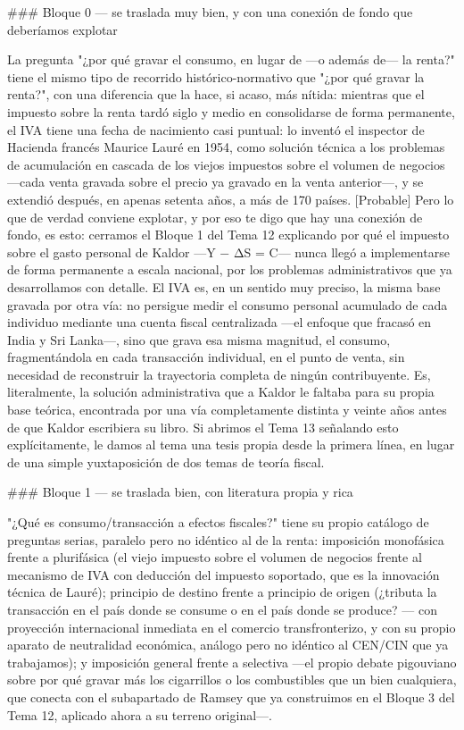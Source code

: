 \documentclass[10pt,a4paper]{article}
\begin{document}
### Bloque 0 — se traslada muy bien, y con una conexión de fondo que deberíamos explotar

La pregunta "¿por qué gravar el consumo, en lugar de —o además de— la renta?" tiene el mismo tipo de recorrido histórico-normativo que "¿por qué gravar la renta?", con una diferencia que la hace, si acaso, más nítida: mientras que el impuesto sobre la renta tardó siglo y medio en consolidarse de forma permanente, el IVA tiene una fecha de nacimiento casi puntual: lo inventó el inspector de Hacienda francés Maurice Lauré en 1954, como solución técnica a los problemas de acumulación en cascada de los viejos impuestos sobre el volumen de negocios —cada venta gravada sobre el precio ya gravado en la venta anterior—, y se extendió después, en apenas setenta años, a más de 170 países. [Probable] Pero lo que de verdad conviene explotar, y por eso te digo que hay una conexión de fondo, es esto: cerramos el Bloque 1 del Tema 12 explicando por qué el impuesto sobre el gasto personal de Kaldor —Y − ΔS = C— nunca llegó a implementarse de forma permanente a escala nacional, por los problemas administrativos que ya desarrollamos con detalle. El IVA es, en un sentido muy preciso, la misma base gravada por otra vía: no persigue medir el consumo personal acumulado de cada individuo mediante una cuenta fiscal centralizada —el enfoque que fracasó en India y Sri Lanka—, sino que grava esa misma magnitud, el consumo, fragmentándola en cada transacción individual, en el punto de venta, sin necesidad de reconstruir la trayectoria completa de ningún contribuyente. Es, literalmente, la solución administrativa que a Kaldor le faltaba para su propia base teórica, encontrada por una vía completamente distinta y veinte años antes de que Kaldor escribiera su libro. Si abrimos el Tema 13 señalando esto explícitamente, le damos al tema una tesis propia desde la primera línea, en lugar de una simple yuxtaposición de dos temas de teoría fiscal.

### Bloque 1 — se traslada bien, con literatura propia y rica

"¿Qué es consumo/transacción a efectos fiscales?" tiene su propio catálogo de preguntas serias, paralelo pero no idéntico al de la renta: imposición monofásica frente a plurifásica (el viejo impuesto sobre el volumen de negocios frente al mecanismo de IVA con deducción del impuesto soportado, que es la innovación técnica de Lauré); principio de destino frente a principio de origen (¿tributa la transacción en el país donde se consume o en el país donde se produce? — con proyección internacional inmediata en el comercio transfronterizo, y con su propio aparato de neutralidad económica, análogo pero no idéntico al CEN/CIN que ya trabajamos); y imposición general frente a selectiva —el propio debate pigouviano sobre por qué gravar más los cigarrillos o los combustibles que un bien cualquiera, que conecta con el subapartado de Ramsey que ya construimos en el Bloque 3 del Tema 12, aplicado ahora a su terreno original—.
\end{document}
